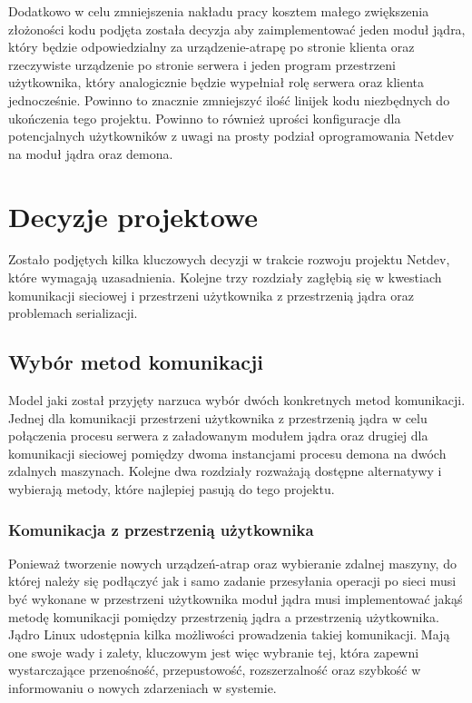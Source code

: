 \documentclass[11pt]{scrartcl}
\let\stdsection\section
\renewcommand\section{\newpage\stdsection}
\begin{document}
Dodatkowo w celu zmniejszenia nakładu pracy kosztem małego zwiększenia złożoności kodu podjęta została decyzja aby zaimplementować jeden moduł jądra, który będzie odpowiedzialny za urządzenie-atrapę po stronie klienta oraz rzeczywiste urządzenie po stronie serwera i jeden program przestrzeni użytkownika, który analogicznie będzie wypełniał rolę serwera oraz klienta jednocześnie. Powinno to znacznie zmniejszyć ilość linijek kodu niezbędnych do ukończenia tego projektu. Powinno to również uprości konfiguracje dla potencjalnych użytkowników z uwagi na prosty podział oprogramowania Netdev na moduł jądra oraz demona.

\section{Decyzje projektowe}

Zostało podjętych kilka kluczowych decyzji w trakcie rozwoju projektu Netdev, które wymagają uzasadnienia. Kolejne trzy rozdziały zagłębią się w kwestiach komunikacji sieciowej i przestrzeni użytkownika z przestrzenią jądra oraz problemach serializacji.

\subsection{Wybór metod komunikacji}
\label{commmethods}

Model jaki został przyjęty narzuca wybór dwóch konkretnych metod komunikacji. Jednej dla komunikacji przestrzeni użytkownika z przestrzenią jądra w celu połączenia procesu serwera z załadowanym modułem jądra oraz drugiej dla komunikacji sieciowej pomiędzy dwoma instancjami procesu demona na dwóch zdalnych maszynach. Kolejne dwa rozdziały rozważają dostępne alternatywy i wybierają metody, które najlepiej pasują do tego projektu.

\subsubsection{Komunikacja z przestrzenią użytkownika}
\label{userlandcomm}

Ponieważ tworzenie nowych urządzeń-atrap oraz wybieranie zdalnej maszyny, do której należy się podłączyć jak i samo zadanie przesyłania operacji po sieci musi być wykonane w przestrzeni użytkownika moduł jądra musi implementować jakąś metodę komunikacji pomiędzy przestrzenią jądra a przestrzenią użytkownika. Jądro Linux udostępnia kilka możliwości prowadzenia takiej komunikacji. Mają one swoje wady i zalety, kluczowym jest więc wybranie tej, która zapewni wystarczające przenośność, przepustowość, rozszerzalność oraz szybkość w informowaniu o nowych zdarzeniach w systemie.
\end{document}
